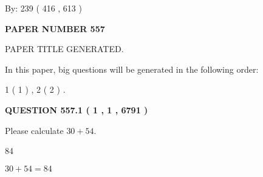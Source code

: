 \documentclass[12pt]{article}
\begin{document}
   
\hspace{1.0in} By: 
 239 ( 416 ,  613 )
   
   
   
   
\newpage 
\setcounter{page}{ 
   557001 } 
   
   
   
   
 {\textbf{ \Large{ PAPER NUMBER  557  }}}
   
   
\vspace{0.2in}
   
   
   
   
   
   
   
   
 \vspace{0.2in}
 
 
 
 
   
   
 PAPER TITLE GENERATED.
   
   
   
\vspace{0.2in}
   
In this paper, big questions will be generated in the following order: 
   
   
   1 ( 1 )
 ,
   2 ( 2 )
 .
  
\vspace{0.2in}
  
{\textbf{\Large{QUESTION
557.1 
 ( 1 , 1 , 6791 )
}}}
  
  
 
Please calculate $ %
30 +  %
54 $.
 
 
 
\noindent{}
 
 

84
 
 
\noindent{}
 
 

 
 
 
\noindent{}
 
 

$ %
30 +  %
54=   %
84$
 
 
\noindent{}
 
\end{document}
